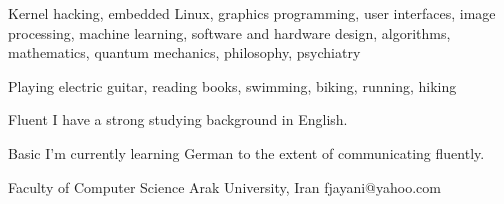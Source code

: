 \documentclass[a4paper,12pt]{memoir} %
\begin{document}



{Kernel hacking, embedded Linux, graphics programming, user interfaces, image processing, machine learning, software and hardware design, algorithms, mathematics, quantum mechanics, philosophy, psychiatry}


{Playing electric guitar, reading books, swimming, biking, running, hiking}


\Sep %




{Fluent}
{I have a strong studying background in English.}

{Basic}
{I'm currently learning German to the extent of communicating fluently.}


\Sep %




{Faculty of Computer Science}
{Arak University, Iran}
{fjayani@yahoo.com}




\Sep %
\end{document}

